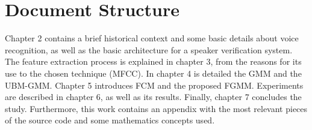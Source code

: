 \section{Document Structure}

Chapter 2 contains a brief historical context and some basic details about voice recognition, as well as the basic architecture for a speaker verification system. The feature extraction process is explained in chapter 3, from the reasons for its use to the chosen technique (MFCC). In chapter 4 is detailed the GMM and the UBM-GMM. Chapter 5 introduces FCM and the proposed FGMM. Experiments are described in chapter 6, as well as its results. Finally, chapter 7 concludes the study. Furthermore, this work contains an appendix with the most relevant pieces of the source code and some mathematics concepts used.